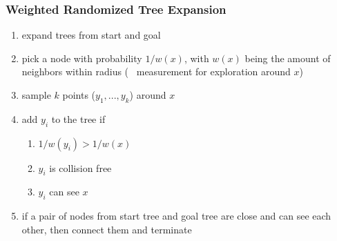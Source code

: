 \begin{multicols*}{2}
\subsubsection{Weighted Randomized Tree Expansion}

\begin{enumerate}
	\item expand trees from start and goal
	\item pick a node with probability $1/w(x)$, with $w(x)$ being the amount of neighbors within radius (~ measurement for exploration around $x$)
	\item sample $k$ points ($y_1, ..., y_k$) around $x$
	\item add $y_i$ to the tree if
	\begin{enumerate}
		\item $1/w(y_i) > 1/w(x)$
		\item $y_i$ is collision free
		\item $y_i$ can see $x$
	\end{enumerate}
	\item if a pair of nodes from start tree and goal tree are close and can see each other, then connect them and terminate
\end{enumerate}


\end{multicols*}
